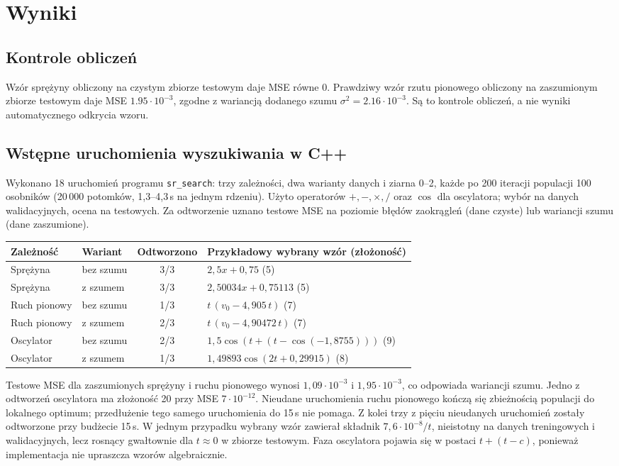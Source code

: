 \documentclass[11pt,a4paper]{article}
\begin{document}
\section{Wyniki}
\subsection{Kontrole obliczeń}
Wzór sprężyny obliczony na czystym
zbiorze testowym daje MSE równe 0. Prawdziwy wzór rzutu pionowego obliczony
na zaszumionym zbiorze testowym daje MSE $1.95\cdot 10^{-3}$, zgodne z wariancją
dodanego szumu $\sigma^2 = 2.16\cdot 10^{-3}$. Są to kontrole obliczeń,
a nie wyniki automatycznego odkrycia wzoru.

\subsection{Wstępne uruchomienia wyszukiwania w C++}
Wykonano 18 uruchomień programu \texttt{sr\_search}: trzy zależności, dwa
warianty danych i ziarna 0--2, każde po 200 iteracji populacji 100 osobników
(20\,000 potomków, 1,3--4,3\,s na jednym rdzeniu). Użyto operatorów
$+,-,\times,/$ oraz $\cos$ dla oscylatora; wybór na danych walidacyjnych,
ocena na testowych. Za odtworzenie uznano testowe MSE na poziomie błędów
zaokrągleń (dane czyste) lub wariancji szumu (dane zaszumione).
\begin{center}
\begin{tabular}{llcl}
\toprule
Zależność & Wariant & Odtworzono & Przykładowy wybrany wzór (złożoność) \\
\midrule
Sprężyna & bez szumu & 3/3 & $2{,}5x + 0{,}75$ (5) \\
Sprężyna & z szumem & 3/3 & $2{,}50034x + 0{,}75113$ (5) \\
Ruch pionowy & bez szumu & 1/3 & $t\,(v_0 - 4{,}905\,t)$ (7) \\
Ruch pionowy & z szumem & 2/3 & $t\,(v_0 - 4{,}90472\,t)$ (7) \\
Oscylator & bez szumu & 2/3 & $1{,}5\cos(t + (t - \cos(-1{,}8755)))$ (9) \\
Oscylator & z szumem & 1/3 & $1{,}49893\cos(2t + 0{,}29915)$ (8) \\
\bottomrule
\end{tabular}
\end{center}
Testowe MSE dla zaszumionych sprężyny i ruchu pionowego wynosi
$1{,}09\cdot10^{-3}$ i $1{,}95\cdot10^{-3}$, co odpowiada wariancji szumu.
Jedno z odtworzeń oscylatora ma złożoność 20 przy MSE $7\cdot10^{-12}$.
Nieudane uruchomienia ruchu pionowego kończą się zbieżnością populacji do
lokalnego optimum; przedłużenie tego samego uruchomienia do 15\,s nie pomaga.
Z kolei trzy z pięciu nieudanych uruchomień zostały odtworzone przy budżecie
15\,s. W jednym przypadku wybrany wzór zawierał składnik $7{,}6\cdot10^{-8}/t$,
nieistotny na danych treningowych i walidacyjnych, lecz rosnący gwałtownie
dla $t\approx 0$ w zbiorze testowym. Faza oscylatora pojawia się w postaci
$t + (t - c)$, ponieważ implementacja nie upraszcza wzorów algebraicznie.
\end{document}
